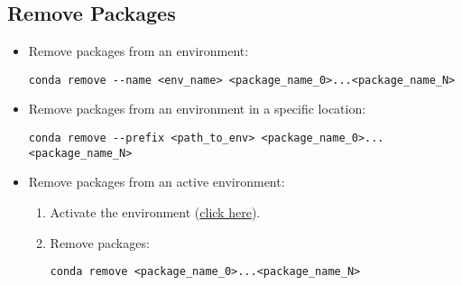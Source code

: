 
\subsection{Remove Packages}

\begin{itemize}
    \item Remove packages from an environment:
    \begin{verbatim}
conda remove --name <env_name> <package_name_0>...<package_name_N>
    \end{verbatim}
    \item Remove packages from an environment in a specific location:
    \begin{verbatim}
conda remove --prefix <path_to_env> <package_name_0>...<package_name_N>
    \end{verbatim}
    \item Remove packages from an active environment:
    \begin{enumerate}
        \item Activate the environment (\hyperref[conda:activateEnv]{click here}).
        \item Remove packages: 
        \begin{verbatim}
conda remove <package_name_0>...<package_name_N>
        \end{verbatim}
    \end{enumerate}
\end{itemize}